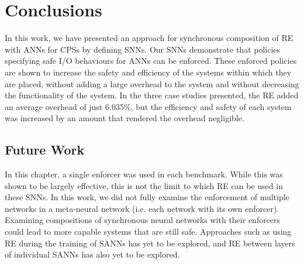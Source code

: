 \section{Conclusions}
\label{sec:conclusion}

In this work, we have presented an approach for synchronous composition of \acf{RE} with \acfp{ANN} for \acp{CPS} by defining \acfp{SNN}.
Our \acp{SNN} demonstrate that policies specifying safe I/O behaviours for \acp{ANN} can be enforced.
These enforced policies are shown to increase the safety and efficiency of the systems within which they are placed, without adding a large overhead to the system and without decreasing the functionality of the system.
In the three case studies presented, the \ac{RE} added an average overhead of just 6.035\%, but the efficiency and safety of each system was increased by an amount that rendered the overhead negligible.

\subsection{Future Work}

In this chapter, a single enforcer was used in each benchmark.
While this was shown to be largely effective, this is not the limit to which \ac{RE} can be used in these \acp{SNN}.
In this work, we did not fully examine the enforcement of multiple networks in a meta-neural network (i.e. each network with its own enforcer).
Examining compositions of synchronous neural networks with their enforcers could lead to more capable systems that are still safe. 
Approaches such as using \ac{RE} during the training of \acp{SANN} has yet to be explored, and \ac{RE} between layers of individual \acp{SANN} has also yet to be explored.




